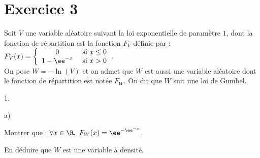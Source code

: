 

\newpage


\section*{Exercice 3}

\noindent
Soit $V$ une variable aléatoire suivant la loi exponentielle de
paramètre $1$, dont la fonction de répartition est la fonction $F_{V}$
définie par : $F_{V}(x) = \left\{
  \begin{array}{cl}
    0 & \hbox{ si } x \leq 0\\
    1-\ee^{-x} & \hbox{ si } x>0
  \end{array}
\right.$.\\
On pose $W = -\ln(V)$ et on admet que $W$ est aussi une variable
aléatoire dont le fonction de répartition est notée $F_{W}$. On dit
que $W$ suit une loi de Gumbel.
\begin{noliste}{1.}
  \setlength{\itemsep}{4mm}
\item
  \begin{noliste}{a)}
    \setlength{\itemsep}{2mm}
  \item Montrer que : $\forall x \in \R, \ F_{W}(x) =
    \ee^{-\ee^{-x}}$.
    
    
    



  \item En déduire que $W$ est une variable à densité.
  
  
  \end{noliste}
\end{noliste}

